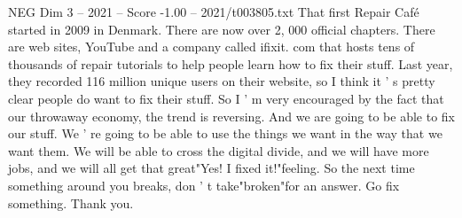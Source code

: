 \begin{textsample}{NEG Dim 3 – 2021 – Score -1.00 – 2021/t003805.txt}
That first Repair Café started in 2009 in Denmark.
There are now over 2, 000 official chapters.
There are web sites, YouTube and a company called ifixit. com that hosts tens of thousands of repair tutorials to help people learn how to fix their stuff.
Last year, they recorded 116 million unique users on their website, so I think it ' s pretty clear people do want to fix their stuff.
So I ' m very encouraged by the fact that our throwaway economy, the trend is reversing.
And we are going to be able to fix our stuff.
We ' re going to be able to use the things we want in the way that we want them.
We will be able to cross the digital divide, and we will have more jobs, and we will all get that great"Yes!
I fixed it!"feeling.
So the next time something around you breaks, don ' t take"broken"for an answer.
Go fix something.
Thank you.

\end{textsample}
